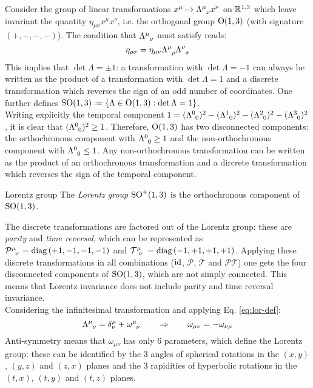 Consider the group of linear transformations $ x^\mu \mapsto \tensor{\Lambda}{^\mu_\nu} x^\nu $ on $ \mathbb{R}^{1,3} $ which leave invariant the quantity $ \eta_{\mu \nu} x^\mu x^\nu $, i.e. the orthogonal group $ \mathrm{O}(1,3) $ (with signature $ (+,-,-,-) $). The condition that $ \tensor{\Lambda}{^\mu_\nu} $ must satisfy reads:
\begin{equation}
  \eta_{\rho \sigma} = \eta_{\mu \nu} \tensor{\Lambda}{^\mu_\rho} \tensor{\Lambda}{^\nu_\sigma}
  \label{eq:lor-def}
\end{equation}
This implies that $ \det \Lambda = \pm 1 $: a transformation with $ \det \Lambda = -1 $ can always be written as the product of a transformation with $ \det \Lambda = 1 $ and a discrete transformation which reverses the sign of an odd number of coordinates. One further defines $ \SOn{1,3} \defeq \{\Lambda \in \On{1,3} : \det \Lambda = 1\} $.\\
Writing explicitly the temporal component $ 1 = (\tensor{\Lambda}{^0_0})^2 - (\tensor{\Lambda}{^1_0})^2 - (\tensor{\Lambda}{^2_0})^2 - (\tensor{\Lambda}{^3_0})^2 $, it is clear that $ (\tensor{\Lambda}{^0_0})^2 \ge 1 $. Therefore, $ \mathrm{O}(1,3) $ has two disconnected components: the orthochronous component with $ \tensor{\Lambda}{^0_0} \ge 1 $ and the non-orthochronous component with $ \tensor{\Lambda}{^0_0} \le 1 $. Any non-orthochronous transformation can be written as the product of an orthochronous transformation and a dircrete transformation which reverses the sign of the temporal component.

\begin{definition}{Lorentz group}{}
  The \textit{Lorentz group} $ \mathrm{SO}^+(1,3) $ is the orthochronous component of $ \mathrm{SO}(1,3) $.
\end{definition}

The discrete transformations are factored out of the Lorentz group: these are \textit{parity} and \textit{time reversal}, which can be represented as $ \tensor{\mathcal{P}}{^\mu_\nu} = \diag \left( +1,-1,-1,-1 \right) $ and $ \tensor{\mathcal{T}}{^\mu_\nu} = \diag \left( -1,+1,+1,+1 \right) $. Applying these discrete transformations in all combinations ($ \operatorname{id} $, $ \mathcal{P} $, $ \mathcal{T} $ and $ \mathcal{P} \mathcal{T} $) one gets the four disconnected components of $ \mathrm{SO}(1,3) $, which are not simply connected. This means that Lorentz invariance does not include parity and time reversal invariance.\\
Considering the infinitesimal transformation and applying Eq. \ref{eq:lor-def}:
\begin{equation*}
  \tensor{\Lambda}{^\mu_\nu} = \delta^\mu_\nu + \tensor{\omega}{^\mu_\nu}
  \qquad \Rightarrow \qquad
  \omega_{\mu \nu} = - \omega_{\nu \mu}
\end{equation*}
Anti-symmetry means that $ \omega_{\mu \nu} $ has only 6 parameters, which define the Lorentz group: these can be identified by the 3 angles of spherical rotations in the $ (x,y) $, $ (y,z) $ and $ (z,x) $ planes and the 3 rapidities of hyperbolic rotations in the $ (t,x) $, $ (t,y) $ and $ (t,z) $ planes.

